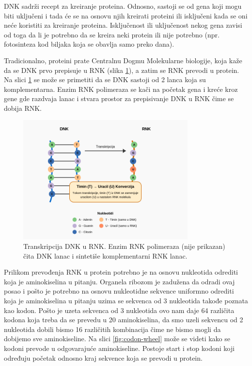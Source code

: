 \documentclass[12pt,oneside]{memoir}
\begin{document}
DNK sadrži recept za kreiranje proteina. Odnosno, sastoji se od gena koji mogu biti uključeni i tada će se na osnovu njih kreirati proteini ili isključeni kada se oni neće koristiti za kreiranje proteina. Isključenost ili uključenost nekog gena zavisi od toga da li je potrebno da se kreira neki protein ili nije potrebno (npr. fotosinteza kod biljaka koja se obavlja samo preko dana).

Tradicionalno, proteini prate Centralnu Dogmu Molekularne biologije, koja kaže da se DNK prvo prepisuje u RNK (slika \ref{fig:transkripcija}), a zatim se RNK prevodi u protein. Na slici \ref{fig:transkripcija} se može se primetiti da se DNK sastoji od 2 lanca koja su komplementarna. Enzim RNK polimeraza se kači na početak gena i kreće kroz gene gde razdvaja lanac i stvara prostor za prepisivanje DNK u RNK čime se dobija RNK.

\begin{figure}[h]
  \centering
  \includegraphics[width=0.8\textwidth]{images/dna_rna_transcription_diagram.png}
  \caption{Transkripcija DNK u RNK. Enzim RNK polimeraza (nije prikazan) čita DNK lanac i sintetiše komplementarni RNK lanac.}
  \label{fig:transkripcija}
\end{figure}

Prilikom prevođenja RNK u protein potrebno je na osnovu nukleotida odrediti koja je aminokiselina u pitanju. Organela ribozom je zadužena da odradi ovaj posao i pošto je potrebno na osnovu nukleotidne sekvence uniformno odrediti koja je aminokiselina u pitanju uzima se sekvenca od 3 nukleotida takođe poznata kao kodon. Pošto je uzeta sekvenca od 3 nukleotida ovo nam daje 64 različita kodona koja treba da se prevedu u 20 aminokiselina, da smo uzeli sekvencu od 2 nukleotida dobili bismo 16 različitih kombinacija čime ne bismo mogli da dobijemo sve aminokiseline. Na slici \ref{fig:codon-wheel} može se videti kako se kodoni prevode u odgovarajuće aminokiseline. Postoje start i stop kodoni koji određuju početak odnosno kraj sekvence koja se prevodi u protein.
\end{document}
